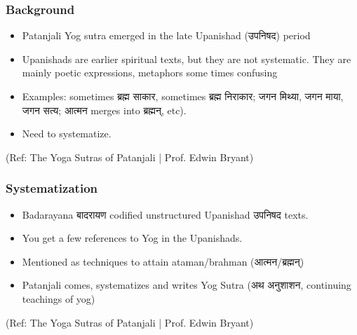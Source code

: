 \begin{frame}[fragile]\frametitle{Background}

	\begin{itemize}
	\item Patanjali Yog sutra emerged in the late Upanishad (उपनिषद) period
	\item Upanishads are earlier spiritual texts, but they are not systematic. They are mainly poetic expressions, metaphors some times confusing
	\item Examples: sometimes ब्रह्म साकार, sometimes ब्रह्म निराकार; जगन मिथ्या, जगन माया, जगन सत्य; आत्मन merges into ब्रह्मन्, etc). 
	\item Need to systematize.
	\end{itemize}

\tiny{(Ref: The Yoga Sutras of Patanjali | Prof. Edwin Bryant)}

\end{frame}

\begin{frame}[fragile]\frametitle{Systematization}

	\begin{itemize}
	\item Badarayana बादरायण codified unstructured Upanishad  उपनिषद texts.
	\item You get a few references to Yog in the Upanishads.
	\item Mentioned as techniques to attain ataman/brahman (आत्मन/ब्रह्मन्)
	\item Patanjali comes, systematizes and writes Yog Sutra (अथ अनुशाशन, continuing teachings of yog)
	\end{itemize}

\tiny{(Ref: The Yoga Sutras of Patanjali | Prof. Edwin Bryant)}

\end{frame}

